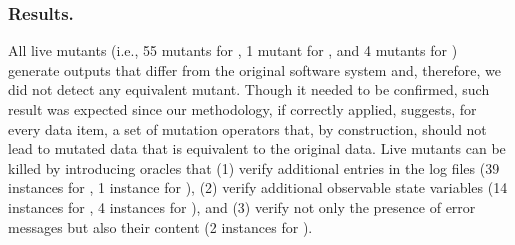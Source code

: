 



%

%


\subsubsection*{Results.}
All live mutants (i.e., 55 mutants for \ADCS, 1 mutant for \GPS, and 4 mutants for \PARAM) generate outputs that differ from the original software system and, therefore, we did not detect any equivalent mutant. Though it needed to be confirmed, such result was expected since our methodology, if correctly applied, suggests, for every data item, a set of mutation operators that, by construction, should not lead to mutated data that is equivalent to the original data.
Live mutants can be killed by introducing oracles that (1) verify additional entries in the log files (39 instances for \ADCS, 1 instance for \GPS), (2) verify additional observable state variables (14 instances for \ADCS, 4 instances for \PARAM), and (3) verify not only the presence of error messages but also their content (2 instances for \ADCS).


